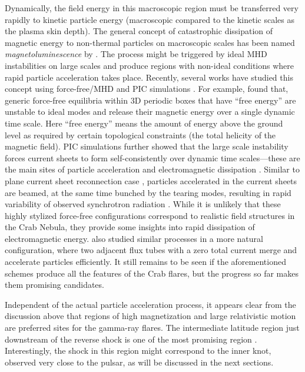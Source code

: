 Dynamically, the field energy in this macroscopic region must be transferred very rapidly to kinetic particle energy (macroscopic compared to the kinetic scales as the plasma skin depth). The general concept of catastrophic dissipation of magnetic energy to non-thermal particles on macroscopic scales has been named \textit{magnetoluminescence} by \citet{Blandford_2014}. The process might be triggered by ideal MHD instabilities on large scales and produce regions with non-ideal conditions where rapid particle acceleration takes place. Recently, several works have studied this concept using force-free/MHD \citep{East_2015,2016arXiv160305731L,Zrake_2016} and PIC simulations \citep{2016arXiv160305731L,Nalewajko_2016,Yuan_2016}. For example, \citet{East_2015} found that, generic force-free equilibria within 3D periodic boxes that have ``free energy'' are unstable to ideal modes and release their magnetic energy over a single dynamic time scale. Here ``free energy'' means the amount of energy above the ground level as required by certain topological constraints (the total helicity of the magnetic field). PIC simulations further showed that the large scale instability forces current sheets to form self-consistently over dynamic time scales---these are the main sites of particle acceleration and electromagnetic dissipation \citep{2016arXiv160305731L,Nalewajko_2016,Yuan_2016}. Similar to plane current sheet reconnection case \citep[e.g.][]{Cerutti_2013}, particles accelerated in the current sheets are beamed, at the same time bunched by the tearing modes, resulting in rapid variability of observed synchrotron radiation \citep{Yuan_2016}. While it is unlikely that these highly stylized force-free configurations correspond to realistic field structures in the Crab Nebula, they provide some insights into rapid dissipation of electromagnetic energy. \citet{2016arXiv160305731L} also studied similar processes in a more natural configuration, where two adjacent flux tubes with a zero total current merge and accelerate particles efficiently. It still remains to be seen if the aforementioned schemes produce all the features of the Crab flares, but the progress so far makes them promising candidates.

Independent of the actual particle acceleration process, it appears clear from the discussion above that regions of high magnetization and large relativistic motion are preferred sites for the gamma-ray flares. The intermediate latitude region just downstream of the reverse shock is one of the most promising region \citet{2016arXiv160305731L}. Interestingly, the shock in this region might correspond to the inner knot, observed very close to the pulsar, as will be discussed in the next sections. 